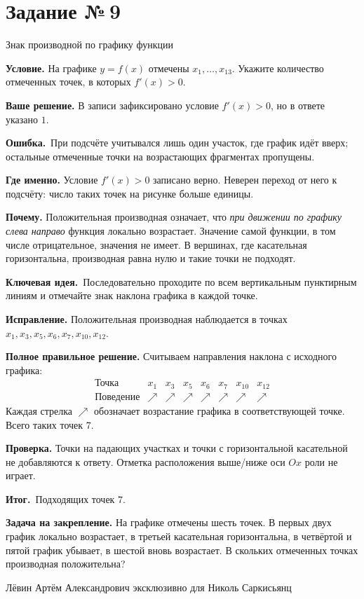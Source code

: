 \documentclass[a4paper,11pt]{article}
\newcommand{\Hdr}[1]{\par\vspace{2pt}\noindent\textbf{#1}\quad}
\newcommand{\E}{\par\smallskip\noindent\textcolor{errorred}{\textbf{Ошибка.}}\ }
\newcommand{\K}{\par\smallskip\noindent\textcolor{accent}{\textbf{Ключевая идея.}}\ }
\newcommand{\I}{\par\smallskip\noindent\textcolor{accent}{\textbf{Итог.}}\ }
\newcommand{\Task}[2]{\clearpage\phantomsection\label{task:#1}\section*{Задание №\,#1}\textcolor{accent}{#2}\par\vspace{7pt}}
\newcommand{\Footer}{\par\vfill\begin{center}\footnotesize\color{ink}Лёвин Артём Александрович эксклюзивно для Николь Саркисьянц\end{center}}
\begin{document}
\Task{9}{Знак производной по графику функции}
\Hdr{Условие.} На графике $y=f(x)$ отмечены $x_1,\ldots,x_{13}$. Укажите количество отмеченных точек, в которых $f'(x)>0$.
\Hdr{Ваше решение.} В записи зафиксировано условие $f'(x)>0$, но в ответе указано $1$.
\E При подсчёте учитывался лишь один участок, где график идёт вверх; остальные отмеченные точки на возрастающих фрагментах пропущены.
\Hdr{Где именно.} Условие $f'(x)>0$ записано верно. Неверен переход от него к подсчёту: число таких точек на рисунке больше единицы.
\Hdr{Почему.} Положительная производная означает, что \emph{при движении по графику слева направо} функция локально возрастает. Значение самой функции, в том числе отрицательное, значения не имеет. В вершинах, где касательная горизонтальна, производная равна нулю и такие точки не подходят.
\K Последовательно проходите по всем вертикальным пунктирным линиям и отмечайте знак наклона графика в каждой точке.
\Hdr{Исправление.} Положительная производная наблюдается в точках $x_1,x_3,x_5,x_6,x_7,x_{10},x_{12}$.
\Hdr{Полное правильное решение.} Считываем направления наклона с исходного графика:
\[
\begin{array}{c|ccccccc}
\text{Точка} &x_1&x_3&x_5&x_6&x_7&x_{10}&x_{12}\\ \hline
\text{Поведение}&\nearrow&\nearrow&\nearrow&\nearrow&\nearrow&\nearrow&\nearrow
\end{array}
\]
Каждая стрелка $\nearrow$ обозначает возрастание графика в соответствующей точке. Всего таких точек $7$.
\Hdr{Проверка.} Точки на падающих участках и точки с горизонтальной касательной не добавляются к ответу. Отметка расположения выше/ниже оси $Ox$ роли не играет.
\I Подходящих точек $\boxed{7}$.
\Hdr{Задача на закрепление.} На графике отмечены шесть точек. В первых двух график локально возрастает, в третьей касательная горизонтальна, в четвёртой и пятой график убывает, в шестой вновь возрастает. В скольких отмеченных точках производная положительна?
\Footer
\end{document}
